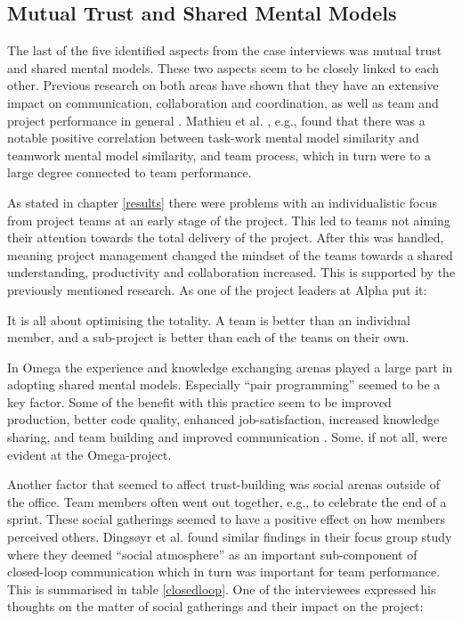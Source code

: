 \subsection{Mutual Trust and Shared Mental Models}
\label{mtasmm}

The last of the five identified aspects from the case interviews was mutual trust and shared mental models. These two aspects seem to be closely linked to each other. Previous research on both areas have shown that they have an extensive impact on communication, collaboration and coordination, as well as team and project performance in general \cite{Bandow2001, Salas2005, cooper1998executive, Mathieu2000}. Mathieu et al. \cite{Mathieu2000}, e.g., found that there was a notable positive correlation between task-work mental model similarity and teamwork mental model similarity, and team process, which in turn were to a large degree connected to team performance.

As stated in chapter \ref{results} there were problems with an individualistic focus from project teams at an early stage of the project. This led to teams not aiming their attention towards the total delivery of the project. After this was handled, meaning project management changed the mindset of the teams towards a shared understanding, productivity and collaboration increased. This is supported by the previously mentioned research. As one of the project leaders at Alpha put it:

\begin{fancyquotes}
It is all about optimising the totality. A team is better than an individual member, and a sub-project is better than each of the teams on their own.
\end{fancyquotes}

In Omega the experience and knowledge exchanging arenas played a large part in adopting shared mental models. Especially ``pair programming'' seemed to be a key factor. Some of the benefit with this practice seem to be improved production, better code quality, enhanced job-satisfaction, increased knowledge sharing, and team building and improved communication \cite{Cockburn2001, Padberg2003}. Some, if not all, were evident at the Omega-project.

Another factor that seemed to affect trust-building was social arenas outside of the office. Team members often went out together, e.g., to celebrate the end of a sprint. These social gatherings seemed to have a positive effect on how members perceived others. Dingsøyr et al. \cite{Dingsoyr2013c} found similar findings in their focus group study where they deemed ``social atmosphere'' as an important sub-component of closed-loop communication which in turn was important for team performance. This is summarised in table \ref{closedloop}. One of the interviewees expressed his thoughts on the matter of social gatherings and their impact on the project:

